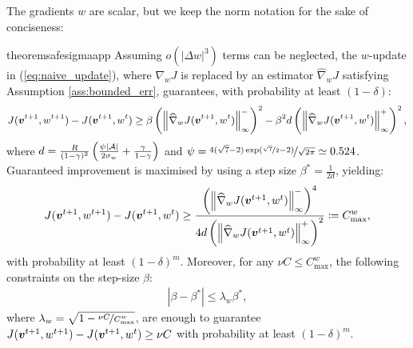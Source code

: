 The gradients \wrt $w$ are scalar, but we keep the norm notation for the sake of conciseness:
%
\begin{restatable}[]{theorem}{safesigmaapp}\label{th:safesigmaapp}
	Assuming $o(|\Delta w|^3)$ terms can be neglected, the $w$-update in (\ref{eq:naive_update}), where $\nabla_wJ$ is replaced by an estimator $\widehat{\nabla}_{w}J$ satisfying Assumption \ref{ass:bounded_err}, guarantees, with probability at least $(1-\delta)$:
	\begin{align}\small
	J(\vv^{t+1}, w^{t+1}) - J(\vv^{t+1}, w^t) \geq \beta\left(\norm[\infty]{\widehat{\nabla}_wJ(\vv^{t+1},w^t)}^-\right)^2 - \beta^2 d\left(\norm[\infty]{\widehat{\nabla}_wJ(\vv^{t+1},w^t)}^+\right)^2,\normalfont
	\end{align}
	where $d=\frac{R}{(1-\gamma)^2}\left(\frac{\psi|\Aspace|}{2\sigma_{w}}+\frac{\gamma}{1-\gamma}\right)$ and $\psi = \nicefrac{4(\sqrt{7} - 2)\exp(\nicefrac{\sqrt{7}}{2} - 2)}{\sqrt{2\pi}} \simeq 0.524$. Guaranteed improvement is maximised by using a step size $\beta^*=\frac{1}{2d}$, yielding:
	\begin{align}
	J(\vv^{t+1},w^{t+1}) - J(\vv^{t+1}, w^t) \geq \frac{\left(\norm[\infty]{\widehat{\nabla}_wJ(\vv^{t+1},w^t)}^-\right)^4}{4d\left(\norm[\infty]{\widehat{\nabla}_wJ(\vv^{t+1},w^t)}^+\right)^2}
	\coloneqq C_{\text{max}}^w, 
	\end{align}
	with probability at least $(1-\delta)^m$. Moreover, for any $\nu C\leq C_{\text{max}}^{w}$, the following constraints on the step-size $\beta$:
	\begin{align}
	|\beta - \beta^*| \leq \lambda_{w}\beta^*, 
	\end{align}
	where $\lambda_{w}=\sqrt{1 - \nicefrac{\nu C}{C_{\text{max}}^{w}}}$, are enough to guarantee $J(\vv^{t+1},w^{t+1}) - J(\vv^{t+1},w^t)\geq \nu C$ with probability at least $(1-\delta)^m$.
\end{restatable}


